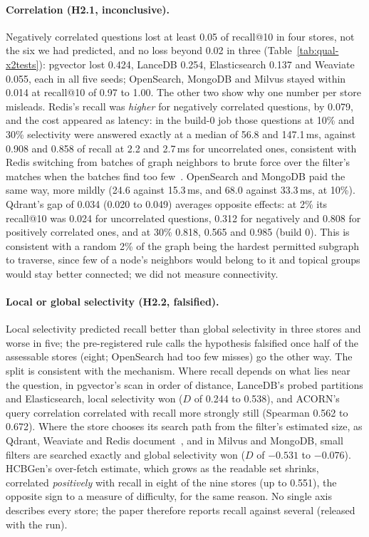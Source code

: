 \paragraph{Correlation (H2.1, inconclusive).}
Negatively correlated questions lost at least 0.05 of recall@10 in four stores, not the six we had
predicted, and no loss beyond 0.02 in three (Table~\ref{tab:qual-x2tests}): pgvector lost 0.424,
LanceDB 0.254, Elasticsearch 0.137 and Weaviate 0.055, each in all five seeds; OpenSearch, MongoDB and
Milvus stayed within 0.014 at recall@10 of 0.97 to 1.00. The other two show why one number per store
misleads. Redis's recall was \emph{higher} for negatively correlated questions, by 0.079, and the cost
appeared as latency: in the build-0 job those questions at 10\% and 30\% selectivity were answered
exactly at a median of 56.8 and 147.1\,ms, against 0.908 and 0.858 of recall at 2.2 and 2.7\,ms for
uncorrelated ones, consistent with Redis switching from batches of graph neighbors to brute force over
the filter's matches when the batches find too few~\cite{redis2026vectors}. OpenSearch and MongoDB
paid the same way, more mildly (24.6 against 15.3\,ms, and 68.0 against 33.3\,ms, at 10\%). Qdrant's
gap of 0.034 (0.020 to 0.049) averages opposite effects: at 2\% its recall@10 was 0.024 for
uncorrelated questions, 0.312 for negatively and 0.808 for positively correlated ones, and at 30\%
0.818, 0.565 and 0.985 (build 0). This is consistent with a random 2\% of the graph being the hardest permitted subgraph to
traverse, since few of a node's neighbors would belong to it and topical groups would stay better connected; we did not measure connectivity.

\paragraph{Local or global selectivity (H2.2, falsified).}
Local selectivity predicted recall better than global selectivity in three stores and worse in five;
the pre-registered rule calls the hypothesis falsified once half of the assessable stores (eight;
OpenSearch had too few misses) go the other way. The split is consistent with the mechanism. Where recall depends on what lies near the question, in pgvector's scan in order of
distance, LanceDB's probed partitions and Elasticsearch, local selectivity won ($D$ of 0.244 to
0.538), and ACORN's query correlation correlated with recall more strongly still (Spearman 0.562 to
0.672). Where the store chooses its search path from the filter's estimated size, as Qdrant, Weaviate
and Redis document~\cite{qdrant2026search,weaviate2026vectorindex,redis2026vectors}, and in Milvus and
MongoDB, small filters are searched exactly and global selectivity won ($D$ of $-0.531$ to $-0.076$).
HCBGen's over-fetch estimate, which grows as the readable set shrinks, correlated \emph{positively}
with recall in eight of the nine stores (up to 0.551), the opposite sign to a measure of difficulty,
for the same reason. No single axis describes every store; the paper therefore reports recall against
several (released with the run).

